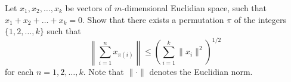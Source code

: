 \documentclass{article}
\begin{document}
	\setlength{\parindent}{0pt}
	Let $x_1, x_2, \dots , x_k$ be vectors of $m$-dimensional Euclidian space, such that $x_1+x_2+\dots+x_k = 0$. Show that there exists a permutation $\pi$ of the integers $\{1, 2,\dots , k\}$ such that
	$$\left\lVert\sum_{i=1}^{n}x_{\pi(i)}\right\rVert\leq\left(\sum_{i=1}^{k}\lVert x_i\rVert^2\right)^{1/2}$$
	for each $n=1,2,\dots,k$. Note that $\lVert\cdot\rVert$ denotes the Euclidian norm.
\end{document}
